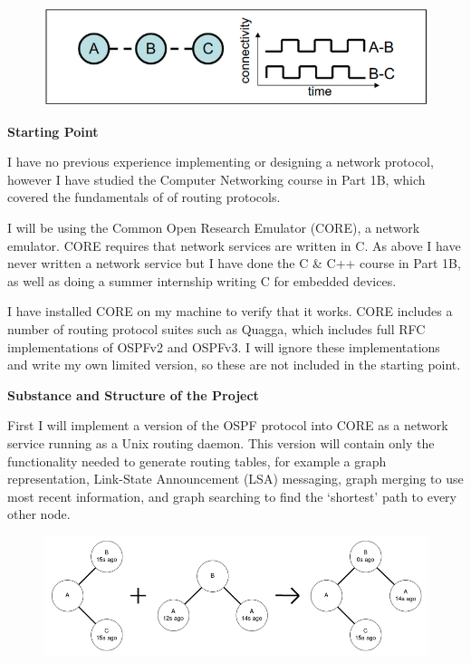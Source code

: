 \documentclass[withindex,glossary,openany]{cam-thesis}
\begin{document}
\begin{figure}[H]
  \centering
  \includegraphics[width=0.8\linewidth]{proposal_1}
\end{figure}

\vspace{8mm}
\LARGE\textbf{Starting Point}\normalsize

I have no previous experience implementing or designing a network protocol, however I have studied the Computer Networking course in Part 1B, which covered the fundamentals of of routing protocols.

I will be using the Common Open Research Emulator (CORE), a network emulator. CORE requires that network services are written in C. As above I have never written a network service but I have done the C \& C++ course in Part 1B, as well as doing a summer internship writing C for embedded devices.

I have installed CORE on my machine to verify that it works. CORE includes a number of routing protocol suites such as Quagga, which includes full RFC implementations of OSPFv2 and OSPFv3. I will ignore these implementations and write my own limited version, so these are not included in the starting point.

\vspace{8mm}
\LARGE\textbf{Substance and Structure of the Project}\normalsize

First I will implement a version of the OSPF protocol into CORE as a network service running as a Unix routing daemon. This version will contain only the functionality needed to generate routing tables, for example a graph representation, Link-State Announcement (LSA) messaging, graph merging to use most recent information, and graph searching to find the ‘shortest’ path to every other node.

\begin{figure}[H]
  \centering
  \includegraphics[width=0.9\linewidth]{proposal_2}
\end{figure}
\end{document}

